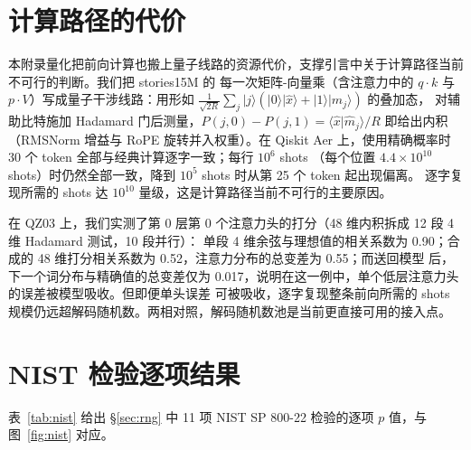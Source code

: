 \documentclass[11pt]{article}
\begin{document}
\appendix
\setcounter{table}{0}
\renewcommand{\thetable}{\thesection\arabic{table}}
\renewcommand{\theHtable}{\thesection\arabic{table}}
\section{计算路径的代价}
\label{app:a}
本附录量化把前向计算也搬上量子线路的资源代价，支撑引言中关于计算路径当前不可行的判断。我们把 stories15M 的%
每一次矩阵-向量乘（含注意力中的 $q\cdot k$ 与 $p\cdot V$）写成量子干涉线路：用形如
$\frac{1}{\sqrt{2R}}\sum_j|j\rangle(|0\rangle|\hat x\rangle+|1\rangle|\hat m_j\rangle)$ 的叠加态，%
对辅助比特施加 Hadamard 门后测量，$P(j,0)-P(j,1)=\langle\hat x|\hat m_j\rangle/R$ 即给出内积（RMSNorm 增益与
RoPE 旋转并入权重）。在 Qiskit Aer 上，使用精确概率时 30 个 token 全部与经典计算逐字一致；每行 $10^6$ shots
（每个位置 $4.4\times10^{10}$ shots）时仍然全部一致，降到 $10^5$ shots 时从第 25 个 token 起出现偏离。%
逐字复现所需的 shots 达 $10^{10}$ 量级，这是计算路径当前不可行的主要原因。

在 QZ03 上，我们实测了第 0 层第 0 个注意力头的打分（48 维内积拆成 12 段 4 维 Hadamard 测试，10 段并行）：%
单段 4 维余弦与理想值的相关系数为 0.90；合成的 48 维打分相关系数为 0.52，注意力分布的总变差为 0.55；而送回模型%
后，下一个词分布与精确值的总变差仅为 0.017，说明在这一例中，单个低层注意力头的误差被模型吸收。但即便单头误差%
可被吸收，逐字复现整条前向所需的 shots 规模仍远超解码随机数。两相对照，解码随机数池是当前更直接可用的接入点。

\section{NIST 检验逐项结果}
\label{app:nist}
表~\ref{tab:nist} 给出 \S\ref{sec:rng} 中 11 项 NIST SP 800-22 检验的逐项 $p$ 值，与图~\ref{fig:nist} 对应。
\end{document}
